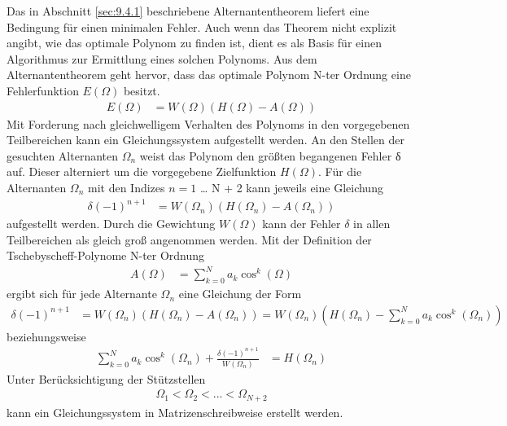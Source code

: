 Das in Abschnitt \ref{sec:9.4.1} beschriebene Alternantentheorem liefert eine Bedingung für einen minimalen Fehler. Auch wenn das Theorem nicht explizit angibt, wie das optimale Polynom zu finden ist, dient es als Basis für einen Algorithmus zur Ermittlung eines solchen Polynoms. Aus dem Alternantentheorem geht hervor, dass das optimale Polynom N-ter Ordnung eine Fehlerfunktion \(E(Ω)\) besitzt.
\begin{align}
E(\Omega) &= W(\Omega)  \left( H(\Omega) - A(\Omega) \right) \label{eq:9.143}
\end{align}
Mit Forderung nach gleichwelligem Verhalten des Polynoms in den vorgegebenen Teilbereichen kann ein Gleichungssystem aufgestellt werden. An den Stellen der gesuchten Alternanten \(Ω_{n}\) weist das Polynom den größten begangenen Fehler δ auf. Dieser alterniert um die vorgegebene Zielfunktion \(H(Ω)\). Für die Alternanten \(Ω_{n}\) mit den Indizes \(n = 1\) \ldots{} N + 2 kann jeweils eine Gleichung
\begin{align}
\delta  ( - 1)^{n + 1} &= W\left( \Omega_{n} \right)  \left( H\left( \Omega_{n} \right) - A\left( \Omega_{n} \right) \right) \label{eq:9.144}
\end{align}
aufgestellt werden. Durch die Gewichtung \(W(Ω)\) kann der Fehler \(\delta\) in allen Teilbereichen als gleich groß angenommen werden. Mit der Definition der Tschebyscheff-Polynome N-ter Ordnung
\begin{align}
A(\Omega) &= \sum\limits_{k = 0}^{N}{a_{k}  \cos^{k}(\Omega)} \label{eq:9.145}
\end{align}
ergibt sich für jede Alternante \(Ω_{n}\) eine Gleichung der Form
\begin{align}
\delta  ( - 1)^{n + 1} &= W\left( \Omega_{n} \right)  \left( H\left( \Omega_{n} \right) - A\left( \Omega_{n} \right) \right) = W\left( \Omega_{n} \right)  \left( H\left( \Omega_{n} \right) - \sum\limits_{k = 0}^{N}{a_{k}  \cos^{k}\left( \Omega_{n} \right)} \right) \label{eq:9.146}
\end{align}
beziehungsweise
\begin{align}
\sum\limits_{k = 0}^{N}{a_{k}  \cos^{k}\left( \Omega_{n} \right)} + \frac{\delta  ( - 1)^{n + 1}}{W\left( \Omega_{n} \right)} &= H\left( \Omega_{n} \right) \label{eq:9.146}
\end{align}
Unter Berücksichtigung der Stützstellen
\begin{align}
\Omega_{1} < \Omega_{2} < ... < \Omega_{N + 2} \label{eq:9.147}
\end{align}
kann ein Gleichungssystem in Matrizenschreibweise erstellt werden.
